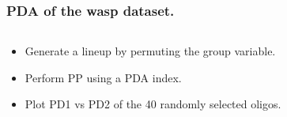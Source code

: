 \documentclass{beamer}
\begin{document}
\begin{frame}
	\frametitle{PDA of the wasp dataset.}
	\begin{columns}
		\begin{column}{0.4\textwidth}
		  \begin{itemize}
			  \item Generate a lineup by permuting the group variable.  
			  \item Perform PP using a PDA index.
			\item Plot PD1 vs PD2 of the 40 randomly selected oligos. 
		  \end{itemize}		
			
		\end{column}
		
		\begin{column}{0.6\textwidth}
			 \begin{center}  \end{center}
		\end{column}
	\end{columns}  

\end{frame}



\end{document}
